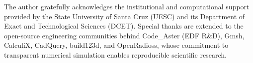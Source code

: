 
The author gratefully acknowledges the institutional and computational support provided by the State University of Santa Cruz (UESC) and its Department of Exact and Technological Sciences (DCET). Special thanks are extended to the open-source engineering communities behind Code\_Aster (EDF R\&D), Gmsh, CalculiX, CadQuery, build123d, and OpenRadioss, whose commitment to transparent numerical simulation enables reproducible scientific research.
